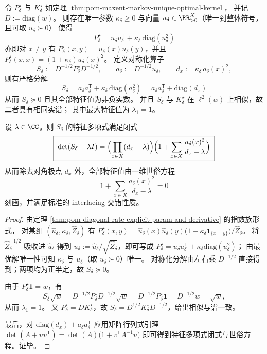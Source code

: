 \begin{theorem}\label{thm:pom-maxent-markov-diagonal-plus-rankone-spectrum}
令 \(P^\star_\delta\) 与 \(K^\star_\delta\) 如定理 \ref{thm:pom-maxent-markov-unique-optimal-kernel}，
并记 \(D:=\mathrm{diag}(w)\)。
则存在唯一参数 \(\kappa_\delta\ge 0\) 与向量 \(u_\delta\in\RR_{>0}^{X}\)（唯一到整体符号，且可取 \(u_\delta\succ0\)）
使得
\[
\boxed{\;
P^\star_\delta=u_\delta u_\delta^{\mathsf T}+\kappa_\delta\,\mathrm{diag}(u_\delta^2)\;}
\]
亦即对 \(x\ne y\) 有 \(P^\star_\delta(x,y)=u_\delta(x)u_\delta(y)\)，并且
\(
P^\star_\delta(x,x)=(1+\kappa_\delta)u_\delta(x)^2
\)。
定义对称化算子
\[
S_\delta:=D^{-1/2}P^\star_\delta D^{-1/2},
\qquad
a_\delta:=D^{-1/2}u_\delta,
\qquad
d_x:=\kappa_\delta\,a_\delta(x)^2,
\]
则有严格分解
\[
\boxed{\;
S_\delta=a_\delta a_\delta^{\mathsf T}+\kappa_\delta\,\mathrm{diag}(a_\delta^2)
=a_\delta a_\delta^{\mathsf T}+\mathrm{diag}(d_x)\;}
\]
从而 \(S_\delta\succeq 0\) 且其全部特征值为非负实数。
并且 \(S_\delta\) 与 \(K^\star_\delta\) 在 \(\ell^2(w)\) 上相似，故二者具有相同实谱；
其中最大特征值为 \(\lambda_1=1\)。
\par
设 \(\lambda\in\CC\)。则 \(S_\delta\) 的特征多项式满足闭式
\[
\boxed{\;
\det(S_\delta-\lambda I)
=\Bigl(\prod_{x\in X}(d_x-\lambda)\Bigr)\Bigl(1+\sum_{x\in X}\frac{a_\delta(x)^2}{d_x-\lambda}\Bigr)\;}
\]
从而除去对角极点 \(d_x\) 外，全部特征值由一维世俗方程
\[
\boxed{\;
1+\sum_{x\in X}\frac{a_\delta(x)^2}{d_x-\lambda}=0\;}
\]
刻画，并满足标准的 interlacing 交错性质。
\end{theorem}
\begin{proof}
由定理 \ref{thm:pom-diagonal-rate-explicit-param-and-derivative} 的指数族形式，
对某组 \((\widehat u_\delta,\kappa_\delta,\widehat Z_\delta)\) 有
\(
P^\star_\delta(x,y)=\widehat u_\delta(x)\widehat u_\delta(y)\bigl(1+\kappa_\delta\mathbf 1_{\{x=y\}}\bigr)/\widehat Z_\delta
\)。
将 \(\widehat Z_\delta^{-1/2}\) 吸收进 \(\widehat u_\delta\) 得到 \(u_\delta:=\widehat u_\delta/\sqrt{\widehat Z_\delta}\)，即可写成
\(
P^\star_\delta=u_\delta u_\delta^{\mathsf T}+\kappa_\delta\mathrm{diag}(u_\delta^2)
\)；
由最优解唯一性可知 \(\kappa_\delta\) 与 \(u_\delta\)（取 \(u_\delta\succ0\)）唯一。
对称化分解由左右乘 \(D^{-1/2}\) 直接得到；两项均为正半定，故 \(S_\delta\succeq 0\)。
\par
由于 \(P^\star_\delta\mathbf 1=w\)，有
\[
S_\delta\sqrt w
=D^{-1/2}P^\star_\delta D^{-1/2}\sqrt w
=D^{-1/2}P^\star_\delta\mathbf 1
=D^{-1/2}w
=\sqrt w,
\]
从而 \(\lambda_1=1\)。
又 \(P^\star_\delta=D K^\star_\delta\)，故
\(
S_\delta=D^{1/2}K^\star_\delta D^{-1/2}
\)，给出相似与谱一致。
\par
最后，对 \(\mathrm{diag}(d_x)+a_\delta a_\delta^{\mathsf T}\) 应用矩阵行列式引理
\(
\det(A+uv^{\mathsf T})=\det(A)\bigl(1+v^{\mathsf T}A^{-1}u\bigr)
\)
即可得到特征多项式闭式与世俗方程。证毕。
\end{proof}

